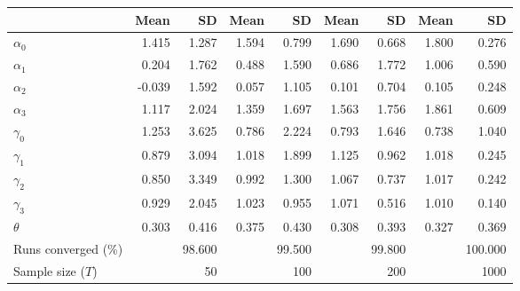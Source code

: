 
\begin{tabular}[t]{lrrrrrrrr}
\toprule
  & Mean & SD & Mean  & SD  & Mean   & SD   & Mean    & SD   \\
\midrule
$\alpha_{0}$ & 1.415 & 1.287 & 1.594 & 0.799 & 1.690 & 0.668 & 1.800 & 0.276\\
$\alpha_{1}$ & 0.204 & 1.762 & 0.488 & 1.590 & 0.686 & 1.772 & 1.006 & 0.590\\
$\alpha_{2}$ & -0.039 & 1.592 & 0.057 & 1.105 & 0.101 & 0.704 & 0.105 & 0.248\\
$\alpha_{3}$ & 1.117 & 2.024 & 1.359 & 1.697 & 1.563 & 1.756 & 1.861 & 0.609\\
$\gamma_{0}$ & 1.253 & 3.625 & 0.786 & 2.224 & 0.793 & 1.646 & 0.738 & 1.040\\
$\gamma_{1}$ & 0.879 & 3.094 & 1.018 & 1.899 & 1.125 & 0.962 & 1.018 & 0.245\\
$\gamma_{2}$ & 0.850 & 3.349 & 0.992 & 1.300 & 1.067 & 0.737 & 1.017 & 0.242\\
$\gamma_{3}$ & 0.929 & 2.045 & 1.023 & 0.955 & 1.071 & 0.516 & 1.010 & 0.140\\
$\theta$ & 0.303 & 0.416 & 0.375 & 0.430 & 0.308 & 0.393 & 0.327 & 0.369\\
Runs converged (\%) &  & 98.600 &  & 99.500 &  & 99.800 &  & 100.000\\
Sample size ($T$) &  & 50 &  & 100 &  & 200 &  & 1000\\
\bottomrule
\end{tabular}

